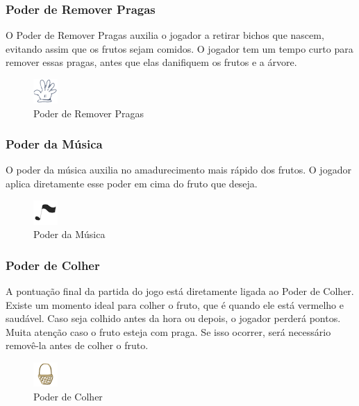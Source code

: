 \documentclass[12pt]{article}
\begin{document}
 \subsubsection{Poder de Remover Pragas}
 O Poder de Remover Pragas auxilia o jogador a retirar bichos que nascem, evitando assim
 que os frutos sejam comidos. O jogador tem um tempo curto para remover essas pragas, antes que
 elas danifiquem os frutos e a \'arvore.

	\begin{figure}[ht!]
	\begin{center}
		\includegraphics[scale=1]{img/icone_luva.png}
		\footnotesize \caption{Poder de Remover Pragas }
	\end{center}
	\end{figure}	
 
 \subsubsection{Poder da M\'usica}
 O poder da m\'usica auxilia no amadurecimento mais r\'apido dos frutos. O jogador aplica diretamente esse poder em cima
 do fruto que deseja.
 
	\begin{figure}[ht!]
	\begin{center}
		\includegraphics[scale=1]{img/icone_nota_musical.png}
		\footnotesize \caption{Poder da M\'usica}
	\end{center}
	\end{figure}	

 \subsubsection{Poder de Colher}
 A pontua\c c\~ao final da partida do jogo est\'a diretamente ligada ao Poder de Colher. Existe um momento ideal para colher o
 fruto, que \'e quando ele est\'a vermelho e saud\'avel. Caso seja colhido antes da hora ou depois, o jogador perder\'a
 pontos. Muita aten\c c\~ao caso o fruto esteja com praga. Se isso ocorrer, ser\'a necess\'ario remov\^e-la antes de
 colher o fruto.
 
	\begin{figure}[ht!]
	\begin{center}
		\includegraphics[scale=1]{img/icone_cesta.png}
		\footnotesize \caption{Poder de Colher}
	\end{center}
	\end{figure}	
\end{document}
